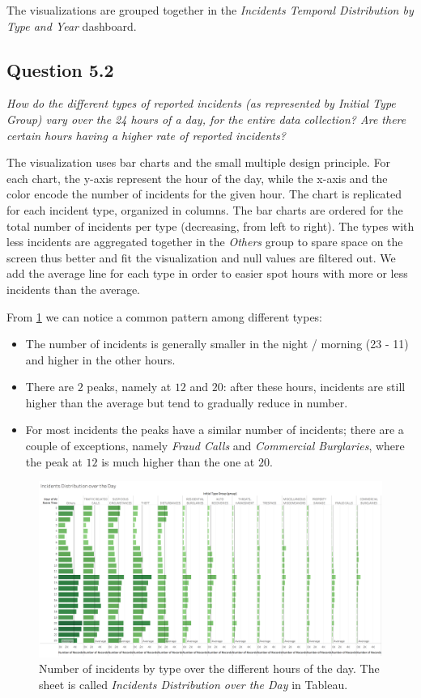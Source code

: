 The visualizations are grouped together in the \textit{Incidents Temporal Distribution by Type and Year} dashboard.


\subsection*{Question 5.2}
\textit{How do the different types of reported incidents (as represented by Initial Type Group) vary over the 24 hours of a day, for the entire data collection? Are there certain hours having a higher rate of reported incidents?}

The visualization uses bar charts and the small multiple design principle.
For each chart, the y-axis represent the hour of the day, while the x-axis and the color encode the number of incidents for the given hour.
The chart is replicated for each incident type, organized in columns.
The bar charts are ordered for the total number of incidents per type (decreasing, from left to right).
The types with less incidents are aggregated together in the \textit{Others} group to spare space on the screen thus better and fit the visualization and null values are filtered out.
We add the average line for each type in order to easier spot hours with more or less incidents than the average.

From \cref{fig:5_2_incidents_by_type_and_hour} we can notice a common pattern among different types:
\begin{itemize}
	\item The number of incidents is generally smaller in the night / morning (23 - 11) and higher in the other hours.
	\item There are $2$ peaks, namely at $12$ and $20$: after these hours, incidents are still higher than the average but tend to gradually reduce in number.
	\item For most incidents the peaks have a similar number of incidents; there are a couple of exceptions, namely \textit{Fraud Calls} and \textit{Commercial Burglaries}, where the peak at $12$ is much higher than the one at $20$. 
\end{itemize}

\begin{figure}[h]
	\centering
	\includegraphics[width=\columnwidth]{figures/5_2_incidents_by_type_and_hour}
	\caption{Number of incidents by type over the different hours of the day. The sheet is called \textit{Incidents Distribution over the Day} in Tableau.}
	\label{fig:5_2_incidents_by_type_and_hour}
\end{figure}

